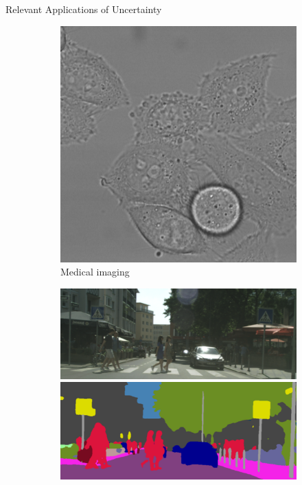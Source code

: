 \documentclass[xcolor={usenames,dvipsnames}]{beamer}
\begin{document}
\begin{frame}{Relevant Applications of Uncertainty}
	\begin{figure}[H]
		\centering
		\begin{subfigure}{0.28\textwidth}
			\centering
			\includegraphics[width=\textwidth]{medical-imaging}	
			\caption{Medical imaging}
		\end{subfigure}
		\pause
		\begin{subfigure}{0.24\textwidth}	
			\centering
			\includegraphics[width=\textwidth]{autonomous-driving-im}
			\includegraphics[width=\textwidth]{autonomous-driving-sem}\\[.2cm]

\end{subfigure}
\end{figure}
\end{frame}
\end{document}
